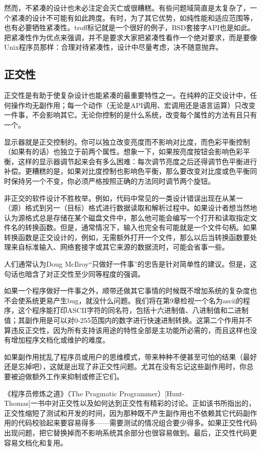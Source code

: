 \documentclass[12pt,oneside]{book}
\begin{document}
\begin{common-format}
然而，不紧凑的设计也未必注定会灭亡或很糟糕。有些问题域简直是太复杂了，一个紧凑的设计不可能有如此跨度。有时，为了其它优势，如纯性能和适应范围等，也有必要牺牲紧凑性。troff标记就是一个很好的例子，BSD套接字API也是如此。把紧凑性作为优点来强调，并不是要求大家把紧凑性看作一个绝对要求，而是要像Unix程序员那样：合理对待紧凑性，设计中尽量考虑，决不随意抛弃。

\subsection{正交性}
正交性是有助于使复杂设计也能紧凑的最重要特性之一。在纯粹的正交设计中，任何操作均无副作用；每一个动作（无论是API调用、宏调用还是语言运算）只改变一件事，不会影响其它。无论你控制的是什么系统，改变每个属性的方法有且只有一个。

显示器就是正交控制的。你可以独立改变亮度而不影响对比度，而色彩平衡控制（如果有的话）也独立于前两个属性。想象一下，如果按亮度按钮会影响色彩平衡，这样的显示器调节起来会有多么困难：每次调节亮度之后还得调节色平衡进行补偿。更糟糕的是，如果对比度控制也影响色平衡，那么要改变对比度或色平衡同时保持另一个不变，你必须严格按照正确的方法同时调节两个旋钮。

非正交的软件设计不胜枚举。例如，代码中常见的一类设计错误出现在从某一（源）格式到另一（目标）格式进行数据读取和解析过程中。如果设计者想当然地认为源格式总是存储在某个磁盘文件中，那么他可能会编写一个打开和读取指定文件名的转换函数。但是，通常情况下，输入也完全有可能就是一个文件句柄。如果转换函数是正交设计的，例如，无需额外打开一个文件，那么以后当转换函数要处理来自标准输入、网络套接字或其它来源的数据流时，可能会省事一些。

人们通常认为Doug McIlroy“只做好一件事”的忠告是针对简单性的建议。但是，这句话也暗含了对正交性至少同等程度的强调。

如果一个程序做好一件事之外，顺带还做其它事情的时候既不增加系统的复杂度也不会使系统更易产生bug，就没什么问题。我们将在第9章检视一个名为ascii的程序，这个程序能打印ASCII字符的同名符，包括十六进制值、八进制值和二进制值；其副作用是可以对0-255范围内的数字进行快速进制转换。这第二个作用并不算违反正交性，因为所有支持该用途的特性全部是主功能所必需的，而且这样也没有增加程序文档化或维护的难度。

如果副作用扰乱了程序员或用户的思维模式，带来种种不便甚至可怕的结果（最好还是忘掉吧），这就是出现了非正交性问题。尤其在没有忘记这些副作用时，你总要被迫做额外工作来抑制或修正它们。

《程序员修炼之道》（The Pragmatic Programmer）[Hunt-\\Thomas]一书中对正交性以及如何达到正交性有精彩的讨论。正如该书所指出的，正交性缩短了测试和开发的时间，因为那种既不产生副作用也不依赖其它代码副作用的代码校验起来要容易得多——需要测试的情况组合要少得多。如果正交性代码出现问题，把它替换掉而不影响系统其余部分也很容易做到。最后，正交性代码更容易文档化和复用。


\end{common-format}
\end{document}
